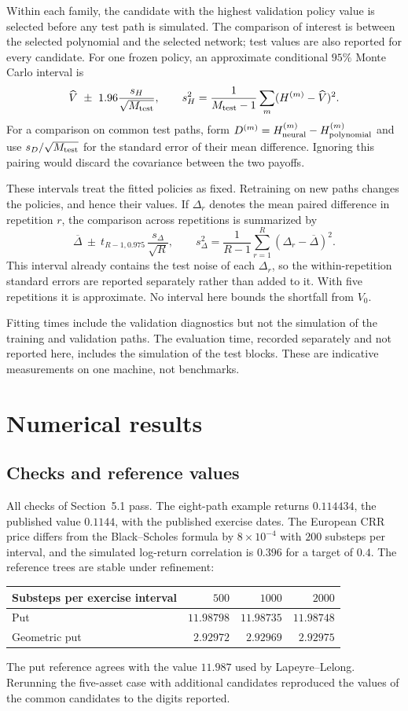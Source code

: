 \documentclass[11pt,a4paper]{article}
\begin{document}
Within each family, the candidate with the highest validation policy value is
selected before any test path is simulated. The comparison of interest is between
the selected polynomial and the selected network; test values are also reported
for every candidate. For one frozen policy, an approximate conditional $95\%$
Monte Carlo interval is
\[
 \widehat V\ \pm\ 1.96\frac{s_H}{\sqrt{M_{\rm test}}},
 \qquad s_H^2=\frac1{M_{\rm test}-1}\sum_m(H^{(m)}-\widehat V)^2.
\]
For a comparison on common test paths, form
$D^{(m)}=H_{\rm neural}^{(m)}-H_{\rm polynomial}^{(m)}$ and use
$s_D/\sqrt{M_{\rm test}}$ for the standard error of their mean difference.
Ignoring this pairing would discard the covariance between the two payoffs.

These intervals treat the fitted policies as fixed. Retraining on new paths changes
the policies, and hence their values. If $\Delta_r$ denotes the mean paired
difference in repetition $r$, the comparison across repetitions is summarized by
\[
 \overline\Delta\ \pm\ t_{R-1,0.975}\,\frac{s_\Delta}{\sqrt R},
 \qquad s_\Delta^2=\frac1{R-1}\sum_{r=1}^R(\Delta_r-\overline\Delta)^2.
\]
This interval already contains the test noise of each $\Delta_r$, so the
within-repetition standard errors are reported separately rather than added to it.
With five repetitions it is approximate. No interval here bounds the shortfall from $V_0$.

Fitting times include the validation diagnostics but not the simulation of the training
and validation paths. The evaluation time, recorded separately and not reported here,
includes the simulation of the test blocks. These are indicative measurements on one
machine, not benchmarks.

\section{Numerical results}
\subsection{Checks and reference values}
All checks of Section~5.1 pass. The eight-path example returns $0.114434$, the
published value $0.1144$, with the published exercise dates. The European CRR price
differs from the Black--Scholes formula by $8\times10^{-4}$ with $200$ substeps per
interval, and the simulated log-return correlation is $0.396$ for a target of $0.4$.
The reference trees are stable under refinement:
\begin{center}
\begin{tabular}{lrrr}
\toprule
Substeps per exercise interval & $500$ & $1000$ & $2000$\\
\midrule
Put & $11.98798$ & $11.98735$ & $11.98748$\\
Geometric put & $2.92972$ & $2.92969$ & $2.92975$\\
\bottomrule
\end{tabular}
\end{center}
The put reference agrees with the value $11.987$ used by Lapeyre--Lelong.
Rerunning the five-asset case with additional candidates reproduced the values of
the common candidates to the digits reported.
\end{document}
